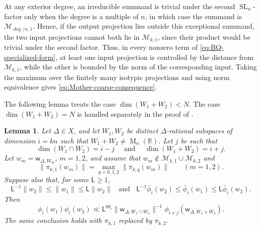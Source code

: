 \documentclass[reqno,11pt]{amsart}
\numberwithin{equation}{section}
\newtheorem{lemma}[theorem]{Lemma}
\theoremstyle{definition}
\theoremstyle{remark}
\newcommand{\op}{\operatorname}
\newcommand{\br}{\mathbb R}
\newcommand{\M}{\op{M}}
\newcommand{\SL}{\op{SL}}
\begin{document}
At any exterior degree, an irreducible summand is trivial under the second
$\SL_n$-factor only when the degree is a multiple of $n$, in which case
the summand is $\mathcal M_{\deg/n,1}$. Hence, if the output projection
lies outside this exceptional summand, the two input projections cannot
both lie in $\mathcal M_{k,1}$, since their product would be trivial under
the second factor. Thus, in every nonzero term of
\eqref{eq:BQ-specialized-form}, at least one input projection is controlled
by the distance from $\mathcal M_{k,1}$, while the other is bounded by the
norm of the corresponding input. Taking the maximum over the finitely many
isotypic projections and using norm equivalence gives
\eqref{eq:Mother-coarse-consequence}.


The following lemma treats the case $\dim(W_1+W_2)<N$. The case
$\dim(W_1+W_2)=N$ is handled separately in the proof of
.
\begin{lemma}\label{lem:BQinequality}
Let $\Delta\in X$, and let $W_1,W_2$ be distinct
$\Delta$-rational subspaces of dimension $i=kn$ such that $W_1+W_2\ne \M_n(\br)$. Let $j$ be such that 
$$
\dim(W_1\cap W_2)=i-j\quad 
\text{ and }\quad
\dim(W_1+W_2)=i+j.
$$
Let $w_m=\mathsf w_{\Delta,W_m}$, $m=1,2$, and assume that
$w_m\notin\mathcal M_{k,1}\cup\mathcal M_{k,2}$ and
$$
\|\pi_{k,1}(w_m)\|
=\max_{q=0,1,2}\|\pi_{k,q}(w_m)\|
\qquad (m=1,2).
$$
Suppose also that, for some $\mathsf L\ge1$,
$$
\mathsf L^{-1}\|w_2\|\le\|w_1\|\le\mathsf L\|w_2\|\;\; \text{ and }\;\; 
\mathsf L^{-1}\bar\phi_i(w_2)
\le\bar\phi_i(w_1)
\le\mathsf L\bar\phi_i(w_2).
$$
Then
\begin{equation}\label{eq:BQ-modified-height-inequality}
\phi_i(w_1)\phi_i(w_2)
\ll
\mathsf L^{8\theta_i}
\|\mathsf w_{\Delta,W_1\cap W_2}\|^{-1}
\phi_{i+j}(\mathsf w_{\Delta,W_1+W_2}).
\end{equation}
The same conclusion holds with $\pi_{k,1}$ replaced by $\pi_{k,2}$.
\end{lemma}
\end{document}
